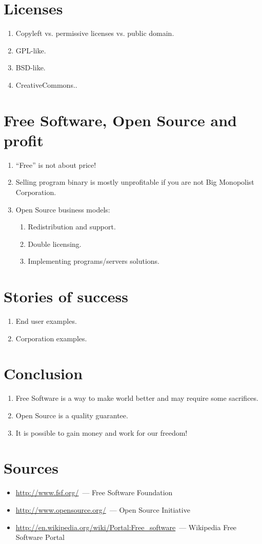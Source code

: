 \documentclass[10pt,a4paper]{article}
\newcommand{\bee}{\begin{enumerate}\setlength{\itemsep}{-0.6mm}}
\newcommand{\ene}{\end{enumerate}}
\newcommand{\bit}{\begin{itemize}\setlength{\itemsep}{-0.6mm}}
\newcommand{\eit}{\end{itemize}}
\begin{document}
\begin{multicols}{2}
\section{Licenses}
\bee
  \item Copyleft vs. permissive licenses vs. public domain.
  \item GPL-like.
  \item BSD-like.
  \item CreativeCommons..
\ene

\section{Free Software, Open Source and profit}
\bee
  \item ``Free'' is not about price!
  \item Selling program binary is mostly unprofitable if you are not Big Monopolist Corporation.
  \item Open Source business models:
  \bee
    \item Redistribution and support.
    \item Double licensing.
    \item Implementing programs/servers solutions.
  \ene
\ene

\section{Stories of success}
\bee
  \item End user examples.
  \item Corporation examples.
\ene

\section{Conclusion}
\bee
  \item Free Software is a way to make world better and may require some 
sacrifices.
  \item Open Source is a quality guarantee.
  \item It is possible to gain money and work for our freedom!
\ene

\end{multicols}

\section*{Sources}
  \bit
    \item \url{http://www.fsf.org/}~--- Free Software Foundation
    \item \url{http://www.opensource.org/}~--- Open Source Initiative
    \item \url{http://en.wikipedia.org/wiki/Portal:Free_software}~--- Wikipedia Free Software Portal
  \eit
\end{document}
